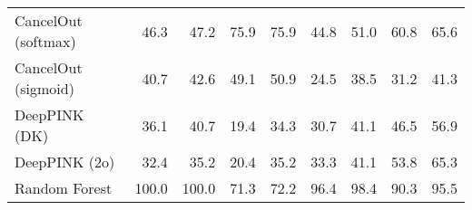 \begin{table}[h!]
\begin{adjustwidth}{-1.0in}{-1.0in}
{\begin{tabular}{lrrrrrrrr}
CancelOut (softmax) & 46.3 & 47.2 & 75.9 & 75.9 & 44.8 & 51.0 & 60.8 & 65.6 \\
CancelOut (sigmoid) & 40.7 & 42.6 & 49.1 & 50.9 & 24.5 & 38.5 & 31.2 & 41.3 \\
DeepPINK (DK) & 36.1 & 40.7 & 19.4 & 34.3 & 30.7 & 41.1 & 46.5 & 56.9 \\
DeepPINK (2o) & 32.4 & 35.2 & 20.4 & 35.2 & 33.3 & 41.1 & 53.8 & 65.3 \\
Random Forest & 100.0 & 100.0 & 71.3 & 72.2 & 96.4 & 98.4 & 90.3 & 95.5 \\
\bottomrule
\end{tabular}}{}
\end{adjustwidth}
\end{table}

